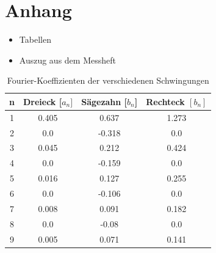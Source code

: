 \documentclass[11pt,ngerman,a4paper]{article}
\begin{document}
\section{Anhang}
\begin{itemize}
\item Tabellen
\item Auszug aus dem Messheft
\end{itemize}

\newpage
\begin{table}
\centering
\begin{tabular}{|c|c|c|c|}

\hline
n & Dreieck [$a_n]$ & S\"agezahn [$b_n$] & Rechteck $[b_n]$ \\
\hline
1 & 0.405 & 0.637 & 1.273\\
2 & 0.0 & -0.318 & 0.0\\
3 & 0.045 & 0.212 & 0.424\\
4 & 0.0 & -0.159 & 0.0\\
5 & 0.016 & 0.127 & 0.255\\
6 & 0.0 & -0.106 & 0.0\\
7 & 0.008 & 0.091 & 0.182\\
8 & 0.0 & -0.08 & 0.0\\
9 & 0.005 & 0.071 & 0.141\\
\hline
\end{tabular}
\label{table1}
\caption{Fourier-Koeffizienten der verschiedenen Schwingungen}
\end{table}
\end{document}
